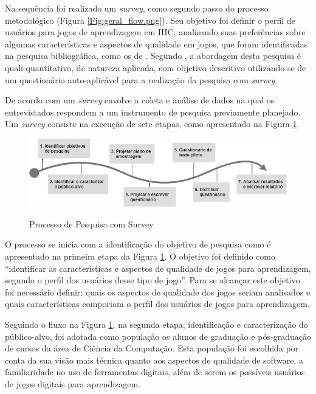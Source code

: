Na sequência foi realizado um \textit{survey}, como segundo passo do processo metodológico (Figura \ref{Fig:geral_flow.png}). Seu objetivo foi definir o perfil de usuários para jogos de aprendizagem em IHC, analisando suas preferências sobre algumas características e aspectos de qualidade em jogos, que foram identificadas na pesquisa bibliográfica, como os de . Segundo , a abordagem desta pesquisa é quali-quantitativo, de natureza aplicada, com objetivo descritivo utilizando-se de um questionário auto-aplicável para a realização da pesquisa com \textit{survey}. 

De acordo com  um \textit{survey} envolve a coleta e análise de dados na qual os entrevistados respondem a um instrumento de pesquisa previamente planejado. Um \textit{survey} consiste na execução de sete etapas, como apresentado na Figura \ref{Fig:survey_flow.png}.

\begin{figure}[htbp]
	\centering
	\caption{Processo de Pesquisa com Survey}
	\includegraphics[keepaspectratio=true,scale=0.625]{figuras/metodologia/flow_survey.png}
	\label{Fig:survey_flow.png}
\end{figure}

O processo se inicia com a identificação do objetivo de pesquisa como é apresentado na primeira etapa da Figura \ref{Fig:survey_flow.png}. O objetivo foi definido como ``identificar as características e aspectos de qualidade de jogos para aprendizagem, segundo o perfil dos usuários desse tipo de jogo''. Para se alcançar este objetivo foi necessário definir: quais os aspectos de qualidade dos jogos seriam analisados e quais características comporiam o perfil dos usuários de jogos para aprendizagem.

Seguindo o fluxo na Figura \ref{Fig:survey_flow.png}, na segunda etapa, identificação e caracterização do público-alvo, foi adotada como população os alunos de graduação e pós-graduação de cursos da área de Ciência da Computação. Esta população foi escolhida por conta da sua visão mais técnica quanto aos aspectos de qualidade de software, a familiaridade no uso de ferramentas digitais, além de serem os possíveis usuários de jogos digitais para aprendizagem.

